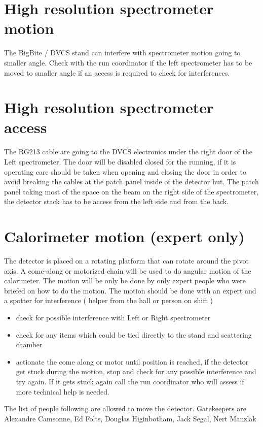 \documentclass{article}
\begin{document}
\section{High resolution spectrometer motion}
The BigBite / DVCS stand can interfere with spectrometer motion going to smaller angle. Check with the run coordinator if the left spectrometer has to be moved to smaller angle if an access is required to check for interferences.


\section{High resolution spectrometer access}
The RG213 cable are going to the DVCS electronics under the right door of the Left spectrometer. The door will be disabled closed for the running, if it is operating care should be taken when opening and closing the door in order to avoid breaking the cables at the patch panel inside of the detector hut.
The patch panel taking most of the space on the beam on the right side of the spectrometer, the detector stack has to be access from the left side and from the back.

\section{Calorimeter motion (expert only)}
The detector is placed on a rotating platform that can rotate around the pivot axis. A come-along or motorized chain will be used to do angular motion of the calorimeter. The motion will be only be done by only expert people who were briefed on how to do the motion. The motion should be done with an expert and a spotter for interference ( helper from the hall or person on shift )
\begin{itemize}
\item check for possible interference with Left or Right spectrometer
\item check for any items which could be tied directly to the stand and scattering chamber
\item actionate the come along or motor until position is reached, if the detector get stuck during the motion, stop and check for any possible interference and try again. If it gets stuck again call the run coordinator who will assess if more technical help is needed.
\end{itemize}

The list of people following are allowed to move the detector.
Gatekeepers are Alexandre Camsonne, Ed Folts, Douglas Higinbotham, Jack Segal, Nert Manzlak 
\end{document}
